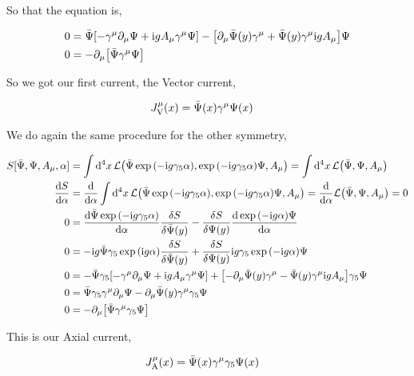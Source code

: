 So that the equation is,

\begin{align}
    0&=\bar\Psi\qty[-\gamma^\mu\partial_\mu\Psi+\textnormal{i} g A_\mu \gamma^\mu \Psi]-\qty[\partial_\mu\bar\Psi\qty(y)\gamma^\mu+\bar\Psi\qty(y)\gamma^\mu\textnormal{i} g A_\mu] \Psi\nonumber\\
    0&=-\partial_\mu\qty[\bar\Psi\gamma^\mu\Psi]\nonumber
\end{align}

So we got our first current, the Vector current,

\begin{align}
    J_{\textnormal V}^\mu\qty(x)&=\bar\Psi\qty(x)\gamma^\mu\Psi\qty(x)\nonumber
\end{align}

We do again the same procedure for the other symmetry,

\begin{align}
    S[\bar\Psi,\Psi,A_\mu,\alpha]&=\int\dd[4]{x}\mathcal L\qty(\bar\Psi\exp\qty(-\im g\gamma_5 \alpha), \exp\qty(-\im g\gamma_5 \alpha)\Psi, A_\mu)=\int\dd[4]{x}\mathcal L\qty(\bar\Psi, \Psi, A_\mu)\nonumber\\
    \dv{S}{\alpha}&=\dv{}{\alpha}\int\dd[4]{x}\mathcal L\qty(\bar\Psi\exp\qty(-\im g\gamma_5 \alpha), \exp\qty(-\im g\gamma_5 \alpha)\Psi, A_\mu)=\dv{}{\alpha}\mathcal L\qty(\bar\Psi, \Psi, A_\mu)=0\nonumber\\
    0&=\dv{\bar\Psi\exp\qty(-\im g \gamma_5\alpha)}{\alpha}\fdv{S}{\bar\Psi\qty(y)}-\fdv{S}{\Psi\qty(y)}\dv{\exp\qty(-\im g \alpha)\Psi}{\alpha}\nonumber\\
    0&=-\im g\bar\Psi\gamma_5\exp\qty(\im g \alpha)\fdv{S}{\bar\Psi\qty(y)}+\fdv{S}{\Psi\qty(y)}\im g\gamma_5 \exp\qty(-\im g \alpha)\Psi\nonumber\\
    0&=-\bar\Psi\gamma_5\qty[-\gamma^\mu\partial_\mu\Psi+\im g A_\mu \gamma^\mu \Psi]+\qty[-\partial_\mu\bar\Psi\qty(y)\gamma^\mu-\bar\Psi\qty(y)\gamma^\mu\im g A_\mu]\gamma_5 \Psi\nonumber\\
    0&=\bar\Psi\gamma_5\gamma^\mu\partial_\mu\Psi-\partial_\mu\bar\Psi\qty(y)\gamma^\mu\gamma_5 \Psi\nonumber\\
    0&=-\partial_\mu\qty[\bar\Psi\gamma^\mu\gamma_5\Psi]\nonumber
\end{align}

This is our Axial current,

\begin{align}
    J_{\textnormal A}^\mu\qty(x)&=\bar\Psi\qty(x)\gamma^\mu\gamma_5\Psi\qty(x)\nonumber
\end{align}

